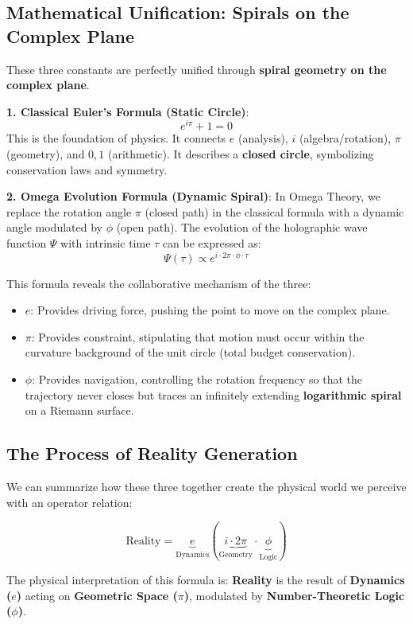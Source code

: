 \subsection{Mathematical Unification: Spirals on the Complex Plane}

These three constants are perfectly unified through \textbf{spiral geometry on the complex plane}.

\textbf{1. Classical Euler's Formula (Static Circle)}:
\[e^{i\pi} + 1 = 0\]
This is the foundation of physics. It connects $e$ (analysis), $i$ (algebra/rotation), $\pi$ (geometry), and $0, 1$ (arithmetic). It describes a \textbf{closed circle}, symbolizing conservation laws and symmetry.

\textbf{2. Omega Evolution Formula (Dynamic Spiral)}:
In Omega Theory, we replace the rotation angle $\pi$ (closed path) in the classical formula with a dynamic angle modulated by $\phi$ (open path). The evolution of the holographic wave function $\Psi$ with intrinsic time $\tau$ can be expressed as:
\[\Psi(\tau) \propto e^{i \cdot 2\pi \cdot \phi \cdot \tau}\]

This formula reveals the collaborative mechanism of the three:
\begin{itemize}
\item \textbf{$e$}: Provides driving force, pushing the point to move on the complex plane.
\item \textbf{$\pi$}: Provides constraint, stipulating that motion must occur within the curvature background of the unit circle (total budget conservation).
\item \textbf{$\phi$}: Provides navigation, controlling the rotation frequency so that the trajectory never closes but traces an infinitely extending \textbf{logarithmic spiral} on a Riemann surface.
\end{itemize}

\subsection{The Process of Reality Generation}

We can summarize how these three together create the physical world we perceive with an operator relation:

\[\text{Reality} = \underbrace{e}_{\text{Dynamics}} \left( \underbrace{i \cdot 2\pi}_{\text{Geometry}} \cdot \underbrace{\phi}_{\text{Logic}} \right)\]

The physical interpretation of this formula is:
\textbf{Reality} is the result of \textbf{Dynamics ($e$)} acting on \textbf{Geometric Space ($\pi$)}, modulated by \textbf{Number-Theoretic Logic ($\phi$)}.


